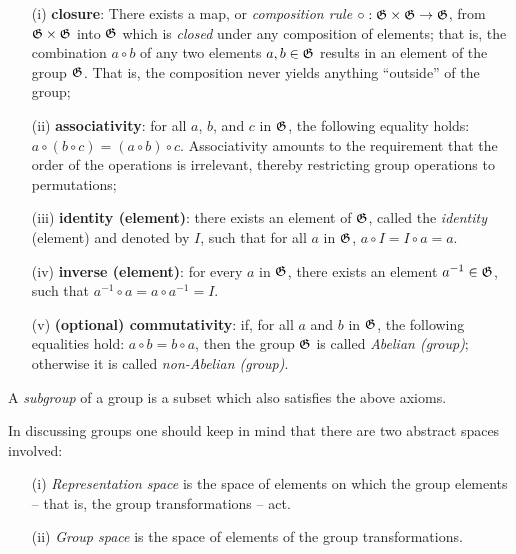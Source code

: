 \begin{itemize}
\item[(i)] {\bf closure}:
There exists a map, or {\em composition rule}  $\circ : {\frak G} \times {\frak G} \rightarrow {\frak G}$, from  ${\frak G} \times {\frak G}$ into ${\frak G}$
which is {\em closed} under any composition
of elements; that is, the combination $a\circ b$ of any two elements
$a,b \in {\frak G}$ results in an element of the group ${\frak G}$.
That is,
the composition never yields anything ``outside'' of the group;
\item[(ii)]
{\bf associativity}:
for all $a$, $b$, and $c$ in ${\frak G}$,
the following equality holds: $a \circ (b \circ c) = (a \circ b) \circ c$.
Associativity amounts to the requirement that the order of the operations is irrelevant,
thereby restricting group operations to permutations;
\item[(iii)]
{\bf identity (element)}:
there exists an element of ${\frak G}$,
called the  {\em identity} (element) and denoted by $I$, such that for all $a$ in ${\frak G}$,
$a \circ I = I \circ  a=  a$.
\item[(iv)]
{\bf inverse (element)}:
for every $a$ in ${\frak G}$, there exists an element $a^{-1} \in {\frak G}$, such that $a^{-1} \circ  a  = a \circ  a^{-1}   =I$.
\item[(v)]
{\bf (optional) commutativity}:
if, for all $a$ and $b$ in ${\frak G}$, the following equalities hold: $a \circ b = b \circ a$,
then the group ${\frak G}$ is called {\em Abelian (group)}; otherwise it is called {\em non-Abelian (group)}.
\end{itemize}


A {\em subgroup} of a group is a subset which also satisfies the above axioms.

In discussing groups one should keep in mind that there are two abstract spaces involved:

\begin{itemize}
\item[(i)] {\em Representation space} is the space of elements on which the group elements -- that is, the group transformations -- act.


\item[(ii)]  {\em Group space} is the space of elements of the group transformations.
\end{itemize}

